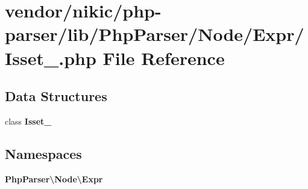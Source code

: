 \section{vendor/nikic/php-\/parser/lib/\+Php\+Parser/\+Node/\+Expr/\+Isset\+\_\+.php File Reference}
\label{_isset___8php}
\subsection*{Data Structures}
\begin{DoxyCompactItemize}
\item 
class {\bf Isset\+\_\+}
\end{DoxyCompactItemize}
\subsection*{Namespaces}
\begin{DoxyCompactItemize}
\item 
 {\bf Php\+Parser\textbackslash{}\+Node\textbackslash{}\+Expr}
\end{DoxyCompactItemize}
